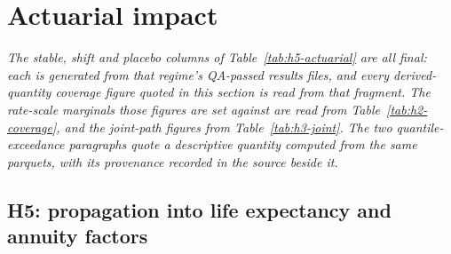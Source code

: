 \section{Actuarial impact}
\label{sec:actuarial}

\noindent\textit{The stable, shift and placebo columns of
Table~\ref{tab:h5-actuarial} are all final: each is generated from that
regime's QA-passed results files, and every derived-quantity coverage
figure quoted in this section is read from that fragment. The rate-scale
marginals those figures are set against are read from
Table~\ref{tab:h2-coverage}, and the joint-path figures from
Table~\ref{tab:h3-joint}. The two quantile-exceedance paragraphs quote a
descriptive quantity computed from the same parquets, with its provenance
recorded in the source beside it.}

\subsection{H5: propagation into life expectancy and annuity factors}


